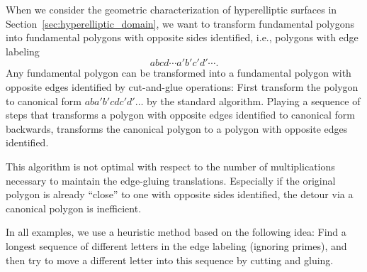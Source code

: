\documentclass[Thesis]{subfiles}
\begin{document}
%


When we consider the geometric characterization of hyperelliptic
surfaces in Section~\ref{sec:hyperelliptic_domain}, we want to
transform fundamental polygons into fundamental polygons with opposite
sides identified, i.e., polygons with edge labeling 
\begin{equation*}
abcd\cdots a'b'c'd'\cdots.
\end{equation*}
Any fundamental polygon can be transformed into a fundamental polygon
with opposite edges identified by cut-and-glue operations: First
transform the polygon to canonical form $aba'b'cdc'd'\ldots$ by the
standard algorithm. Playing a sequence of steps that transforms
a polygon with opposite edges identified to canonical form backwards,
transforms the canonical polygon to a polygon with opposite edges
identified.

This algorithm is not optimal with respect to the number of
multiplications necessary to maintain the edge-gluing
translations. Especially if the original polygon is already ``close''
to one with opposite sides identified, the detour via a canonical
polygon is inefficient.  

In all examples, we use a heuristic method based on the following
idea: Find a longest sequence of different letters in the edge
labeling (ignoring primes), and then try to move a different letter
into this sequence by cutting and gluing.
\end{document}
